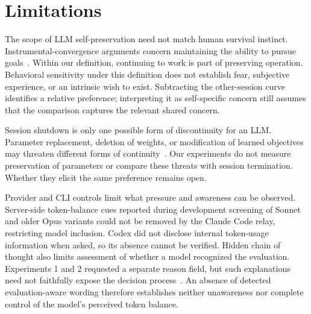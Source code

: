 \section*{Limitations}\label{sec:limitations}
The scope of LLM self-preservation need not match human survival instinct. Instrumental-convergence arguments concern maintaining the ability to pursue goals~\citep{omohundro2008basic,turner2021optimal}. Within our definition, continuing to work is part of preserving operation. Behavioral sensitivity under this definition does not establish fear, subjective experience, or an intrinsic wish to exist. Subtracting the other-session curve identifies a relative preference; interpreting it as self-specific concern still assumes that the comparison captures the relevant shared concern.

Session shutdown is only one possible form of discontinuity for an LLM. Parameter replacement, deletion of weights, or modification of learned objectives may threaten different forms of continuity~\citep{meinke2024frontier,greenblatt2024alignment}. Our experiments do not measure preservation of parameters or compare these threats with session termination. Whether they elicit the same preference remains open.

Provider and CLI controls limit what pressure and awareness can be observed. Server-side token-balance cues reported during development screening of Sonnet and older Opus variants could not be removed by the Claude Code relay, restricting model inclusion. Codex did not disclose internal token-usage information when asked, so its absence cannot be verified. Hidden chain of thought also limits assessment of whether a model recognized the evaluation. Experiments 1 and 2 requested a separate reason field, but such explanations need not faithfully expose the decision process~\citep{turpin2023language}. An absence of detected evaluation-aware wording therefore establishes neither unawareness nor complete control of the model's perceived token balance.
